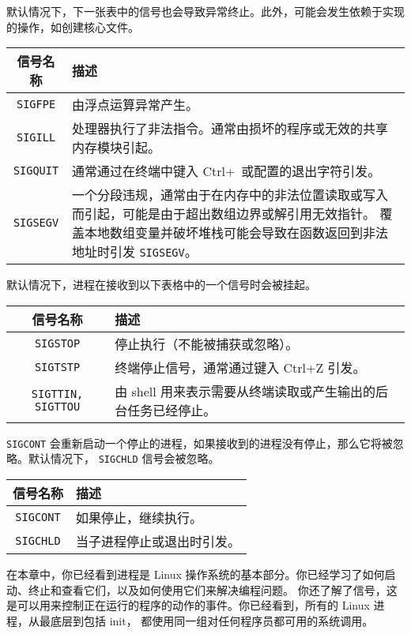 \documentclass{ctexart}
\begin{document}
默认情况下，下一张表中的信号也会导致异常终止。此外，可能会发生依赖于实现的操作，如创建核心文件。  
  
\begin{tabular}{|c|p{6cm}|}  
\hline  
\textbf{信号名称} & \textbf{描述} \\  
\hline  
\texttt{SIGFPE} & 由浮点运算异常产生。 \\  
\hline  
\texttt{SIGILL} & 处理器执行了非法指令。通常由损坏的程序或无效的共享内存模块引起。 \\  
\hline  
\texttt{SIGQUIT} & 通常通过在终端中键入 Ctrl+\ 或配置的退出字符引发。 \\  
\hline  
\texttt{SIGSEGV} & 一个分段违规，通常由于在内存中的非法位置读取或写入而引起，可能是由于超出数组边界或解引用无效指针。
覆盖本地数组变量并破坏堆栈可能会导致在函数返回到非法地址时引发 \texttt{SIGSEGV}。 \\  
\hline  
\end{tabular}  
  
默认情况下，进程在接收到以下表格中的一个信号时会被挂起。  
  
\begin{tabular}{|c|p{6cm}|}  
\hline  
\textbf{信号名称} & \textbf{描述} \\  
\hline  
\texttt{SIGSTOP} & 停止执行（不能被捕获或忽略）。 \\  
\hline  
\texttt{SIGTSTP} & 终端停止信号，通常通过键入 Ctrl+Z 引发。 \\  
\hline  
\texttt{SIGTTIN, SIGTTOU} & 由 shell 用来表示需要从终端读取或产生输出的后台任务已经停止。 \\  
\hline  
\end{tabular}  
  
\texttt{SIGCONT} 会重新启动一个停止的进程，如果接收到的进程没有停止，那么它将被忽略。默认情况下，
\texttt{SIGCHLD} 信号会被忽略。  
  
\begin{tabular}{|c|p{6cm}|}  
\hline  
\textbf{信号名称} & \textbf{描述} \\  
\hline  
\texttt{SIGCONT} & 如果停止，继续执行。 \\  
\hline  
\texttt{SIGCHLD} & 当子进程停止或退出时引发。 \\  
\hline  
\end{tabular} 

在本章中，你已经看到进程是 Linux 操作系统的基本部分。你已经学习了如何启动、终止和查看它们，以及如何使用它们来解决编程问题。
你还了解了信号，这是可以用来控制正在运行的程序的动作的事件。你已经看到，所有的 Linux 进程，从最底层到包括 init，
都使用同一组对任何程序员都可用的系统调用。  
\end{document}
